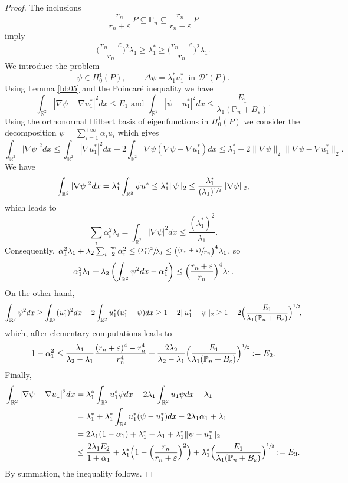 \documentclass[11pt]{article}
\numberwithin{equation}{section}\newtheorem*{jepEnonce}{\jepEnonceTitle}\newenvironment{enonce*}[1]{\def\jepEnonceTitle{#1}\jepEnonce}{\endjepEnonce}\newtheorem*{conj*}{Conjecture}
\newcommand{\psfrac}[2]{\sfrac{(#1)}{#2}}
\theoremstyle{plain}
\theoremstyle{definition}
\let\Bbb\mathbb
\newcommand{\vps}{\varepsilon}
\newcommand{\lb}{\lambda}
\newcommand{\sq}{\subseteq}
\let\jepOriginalSfrac\sfrac
\renewcommand{\sfrac}[2]{{\jepOriginalSfrac{#1}{#2}}}
\begin{document}
\begin{proof}
The inclusions
\[
\frac{r_n}{r_n+\vps}\, P \sq \Bbb P_n \sq \frac{r_n}{r_n-\vps}\, P
\]
imply
\[
\Big (\frac{r_n+\vps} {r_n}\Big)^2\lb_1\ge \lb_1^* \ge \Big (\frac{r_n-\vps} {r_n}\Big)^2\lb_1.
\]
We introduce the problem
\[
\psi \in H^1_0(P),\quad -\Delta \psi = \lb_1^* u_1^* \ \mbox{ in } {\mathcal D'}(P).
\]
Using Lemma \ref{bb05} and the Poincaré inequality we have
\[
\int_{\Bbb{R}^2} |\nabla \psi -\nabla u_1^*|^2 dx \le E_1 \text{ and } \int_{\Bbb{R}^2} | \psi - u_1^*|^2 dx\le \frac{E_1}{\lb_1(\Bbb P_n+ B_\vps)}.
\]
Using the orthonormal Hilbert basis of eigenfunctions in $H^1_0(P)$ we consider the decom\-position
$\psi=\sum_{i=1}^{+\infty} \alpha_i u_i$ which gives
\[
\int_{\Bbb{R}^2} |\nabla \psi |^2 dx \le \int_{\Bbb{R}^2} |\nabla u_1^* |^2 dx + 2 \int_{\Bbb{R}^2} \nabla \psi (\nabla \psi -\nabla u_1^*) dx\le \lb_1^*+ 2 \|\nabla \psi\|_2 \|\nabla \psi-\nabla u_1^*\|_2.
\]
We have
\[
\int_{\Bbb{R}^2} |\nabla \psi |^2 dx = \lb_1^* \int_{\Bbb{R}^2} \psi u^*\le \lb_1^* \|\psi \|_2\le \frac{\lb_1^*}{(\lb_1)^{\sfrac 12}} \|\nabla \psi \|_2,
\]
which leads to
\[
\sum_i \alpha_i^2 \lb_i = \int_{\Bbb{R}^2} |\nabla \psi |^2 dx \le \frac{(\lb_1^*)^2}{\lb_1 }.
\]
Consequently,
$\alpha_1^2 \lb_1 + \lb_2 \sum _{i=2}^{+\infty} \alpha_i^2\le \sfrac{(\lb_1^*)^2}{\lb_1 }\le\big (\psfrac{r_n+\vps} {r_n}\big)^4\lb_1$,
so
\[
\alpha_1^2 \lb_1 + \lb_2 \left(\int_{\Bbb{R}^2} \psi^2dx -\alpha_1^2\right) \le \Bigl(\frac{r_n+\vps} {r_n}\Bigr)^4\lb_1.
\]
On the other hand,
\[
\int_{\Bbb{R}^2} \psi^2dx \ge \int_{\Bbb{R}^2} (u_1^*)^2 dx- 2 \int_{\Bbb{R}^2} u_1^*(u_1^*-\psi) dx \ge 1-2\|u_1^*-\psi\|_2 \ge 1-2\Bigl(\frac{E_1}{\lb_1(\mathbb P_n+ B_\vps)}\Bigr)^{\sfrac12}\!,
\]
which, after elementary computations leads to
\[
1-\alpha_1^2 \le \frac{\lb_1}{\lb_2-\lb_1}\frac{(r_n+\vps)^4-r_n^4}{r_n^4} + \frac{2\lb_2}{\lb_2-\lb_1}\Bigl(\frac{E_1}{\lb_1(\mathbb P_n+ B_\vps)}\Bigr)^{\sfrac12}:= E_2.
\]
Finally,
\begin{align*}
\int_{\Bbb{R}^2}|\nabla \psi -\nabla u_1 |^2 dx &= \lb_1^*\int_{\Bbb{R}^2} u_1^* \psi dx -2\lb_1\int_{\Bbb{R}^2} u_1 \psi dx+ \lb_1
\\
&=\lb_1^*+ \lb_1^*\int_{\Bbb{R}^2} u_1^* (\psi -u_1^*)dx-2\lb_1 \alpha_1+ \lb_1
\\
&= 2 \lb_1(1-\alpha_1)+ \lb_1^*-\lb_1+ \lb_1^* \|\psi -u_1^*\|_2
\\
&\le \frac{2 \lb_1 E_2}{1+\alpha_1}+\lb_1^*\Bigl(1- \Bigl(\frac{r_n}{r_n+\vps }\Bigr)^2\Bigr)+\lb_1^* \Bigl(\frac{E_1}{\lb_1(\mathbb P_n+ B_\vps)}\Bigr)^{\sfrac12}:=E_3.
\end{align*}
By summation, the inequality follows.
\end{proof}
\end{document}
